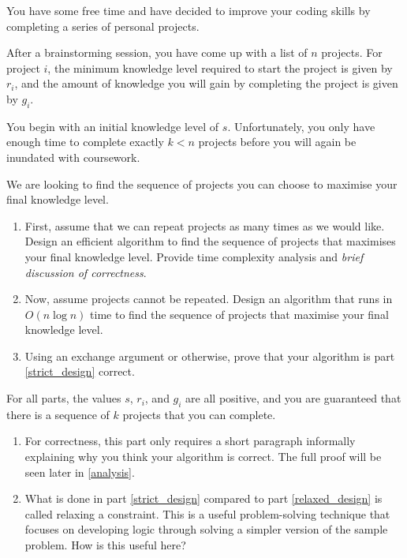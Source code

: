 \documentclass[12pt]{article}
\begin{document}
\begin{question}
You have some free time and have decided to improve your coding skills by completing a series of personal projects.

After a brainstorming session, you have come up with a list of $n$ projects. For project $i$, the minimum knowledge level required to start the project is given by $r_i$, and the amount of knowledge you will gain by completing the project is given by $g_i$.

You begin with an initial knowledge level of $s$. Unfortunately, you only have enough time to complete exactly $k < n$ projects before you will again be inundated with coursework.

We are looking to find the sequence of projects you can choose to maximise your final knowledge level. 

\begin{enumerate}
    \item \label{relaxed_design} First, assume that we can repeat projects as many times as we would like. Design an efficient algorithm to find the sequence of projects that maximises your final knowledge level. Provide time complexity analysis and \emph{brief discussion of correctness}.    
    \item \label{strict_design} Now, assume projects cannot be repeated. Design an algorithm that runs in $O(n\log n)$ time to find the sequence of projects that maximise your final knowledge level. 
    \item \label{analysis} Using an exchange argument or otherwise, prove that your algorithm is part \ref{strict_design} correct.
\end{enumerate}

\note For all parts, the values $s$, $r_i$, and $g_i$ are all positive, and you are guaranteed that there is a sequence of $k$ projects that you can complete.
\end{question}

\begin{rubric}
\begin{enumerate}
    \item For correctness, this part only requires a short paragraph informally explaining why you think your algorithm is correct. The full proof will be seen later in \ref{analysis}.
    \item What is done in part \ref{strict_design} compared to part \ref{relaxed_design} is called relaxing a constraint. This is a useful problem-solving technique that focuses on developing logic through solving a simpler version of the sample problem. How is this useful here? 
\end{enumerate}

\end{rubric}

\clearpage
\begin{solution}
\end{solution}
\begin{attribution}
\end{attribution}
\end{document}
